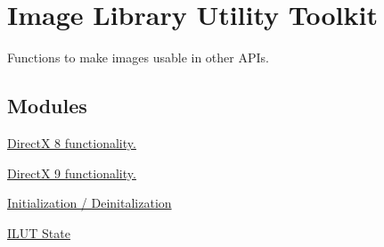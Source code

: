 \hypertarget{group___i_l_u_t}{\section{Image Library Utility Toolkit}
\label{group___i_l_u_t}
}


Functions to make images usable in other A\+P\+Is.  


\subsection*{Modules}
\begin{DoxyCompactItemize}
\item 
\hyperlink{group__ilut__dx8}{Direct\+X 8 functionality.}
\item 
\hyperlink{group__ilut__dx9}{Direct\+X 9 functionality.}
\item 
\hyperlink{group__ilu__setup}{Initialization / Deinitalization}
\item 
\hyperlink{group__ilut__state}{I\+L\+U\+T State}
\end{DoxyCompactItemize}
